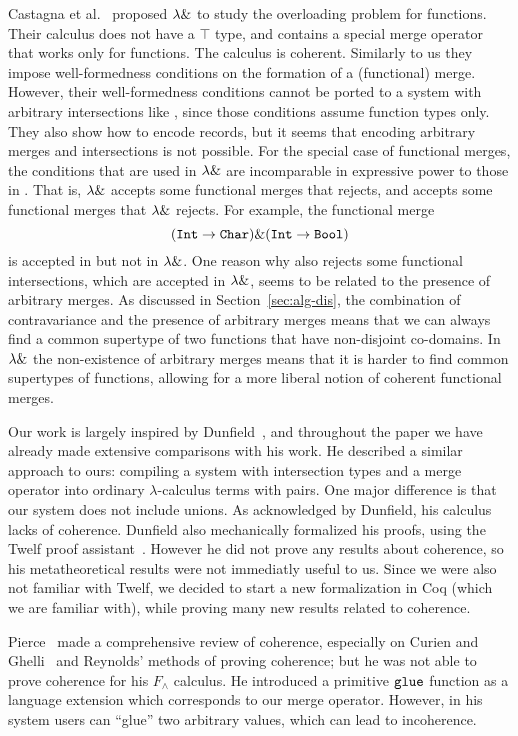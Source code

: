 Castagna et al.~\cite{Castagna92calculus} proposed $\lambda \&$ to study
the overloading problem for functions. Their calculus does not have a
$\top$ type, and contains a special merge operator that works only for
functions. The calculus is coherent. Similarly to us they impose
well-formedness conditions on the formation of a (functional)
merge. However, their well-formedness conditions cannot be ported to a
system with arbitrary intersections like \name, since those conditions
assume function types only.  They also show how to encode records, but
it seems that encoding arbitrary merges and intersections is not
possible.  For the special case of functional
merges, the conditions that are used in $\lambda \&$ are incomparable in
expressive power to those in \name. That is, $\lambda \&$ accepts some
functional merges that \name rejects, and \name accepts some
functional merges that $\lambda \&$ rejects. For example, the functional
merge
\[(\texttt{Int}\to\texttt{Char})\&(\texttt{Int}\to\texttt{Bool})\] 
\noindent is accepted in \name but not in $\lambda \&$. One reason 
why \name also rejects some functional intersections, which are 
accepted in $\lambda \&$, seems to be related to the presence of arbitrary 
merges. As discussed in Section~\ref{sec:alg-dis}, the combination of
contravariance and the presence of arbitrary merges means that we can
always find a common supertype of two functions that have non-disjoint
co-domains. In $\lambda \&$ the non-existence of arbitrary merges means
that it is harder to find common supertypes of functions, allowing for
a more liberal notion of coherent functional merges.  

Our work is largely inspired by
Dunfield~\cite{dunfield2014elaborating}, and throughout the paper we
have already made extensive comparisons with his work. He
described a similar approach to ours: compiling a system with intersection types
and a merge operator into ordinary $ \lambda $-calculus terms with pairs. One
major difference is that our system does not include unions. As
acknowledged by Dunfield, his calculus lacks of coherence. Dunfield
also mechanically formalized his proofs, using the Twelf proof
assistant~\cite{Pfenning99cade}. However he did not prove any results about
coherence, so his metatheoretical results were not immediatly
useful to us. Since we were also not familiar with Twelf, we decided to
start a new formalization in Coq (which we are familiar with), while
proving many new results related to coherence.


Pierce~\cite{pierce1991programming2} made a comprehensive review
of coherence, especially on Curien and Ghelli~\cite{curienl1990coherence} and
Reynolds' methods of proving coherence; but he was not able to prove coherence
for his $F_\wedge$ calculus. He introduced a primitive $\texttt{glue}$ function as
a language extension which corresponds to our merge operator. However, in his
system users can ``glue'' two arbitrary values, which can lead to incoherence.

